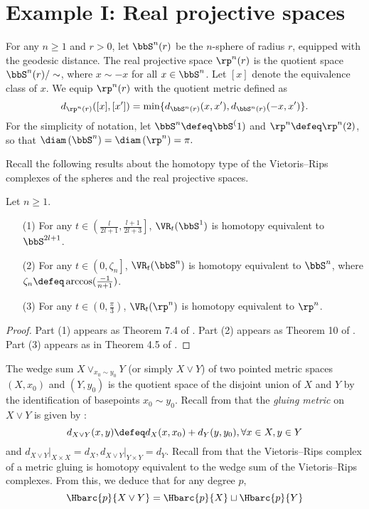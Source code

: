 
\section{Example I: Real projective spaces}\label{s:continuous}

For any $n\geq 1$ and $r>0$, let $\bbS^n(r)$ be the $n$-sphere of radius $r$, equipped with the geodesic distance.
The real projective space $\rp^n(r)$ is the quotient space $\bbS^n(r)/\sim$, where $x\sim -x$ for all $x\in \bbS^n $. Let $[x]$ denote the equivalence class of $x$. We equip $\rp^n(r)$ with the quotient metric defined as
\[d_{\rp^n(r)}([x],[x'])=\min \{d_{\bbS^n(r)}(x,x'),d_{\bbS^n(r)}(-x,x')\}.\]
For the simplicity of notation, let $\bbS^n\defeq\bbS^(1)$ and $\rp^n\defeq\rp^n(2)$, so that $\diam\left(\bbS^n \right)=\diam\left(\rp^n \right)=\pi.$

Recall the following results about the homotopy type of the Vietoris--Rips complexes of the spheres and the real projective spaces.
\begin{proposition}\label{prop:homotopy type}
	Let $n\geq 1$.
	\begin{itemize}
		\item[(1)]\label{prop:S1} For any $ t\in \left(\frac{l}{2l+1},\frac{l+1}{2l+3}\right]$, $\VR_t(\bbS^1)$ is homotopy equivalent to $\bbS^{2l+1}$.
		\item[(2)]\label{prop:Sn} For any $ t\in \left(0,\zeta_n\right]$, $\VR_t(\bbS^n)$ is homotopy equivalent to $\bbS^n$, where $\zeta_n\defeq\arccos(\frac{-1}{n+1})$.
		\item[(3)]\label{prop:RPn} For any $ t\in \left(0,\frac{\pi}{3} \right)$, $\VR_t(\rp^n)$ is homotopy equivalent to $\rp^n$.
	\end{itemize}
\end{proposition}

\begin{proof}
	Part (1) appears as Theorem 7.4 of \cite{adamaszek2017vietoris}. Part (2) appears as Theorem 10 of \cite{lim2020vietoris}. Part (3) appears as in Theorem 4.5 of \cite{adams2022metric}.
\end{proof}

The wedge sum $X\vee_{x_0\sim y_0} Y$ (or simply $X\vee Y$) of two pointed metric spaces $(X,x_0)$ and $(Y,y_0)$ is the quotient space of the disjoint union of $X$ and $Y$ by the identification of basepoints $x_0\sim y_0$.
Recall from \cite{burago2001course,adamaszek2020homotopy} that the \emph{gluing metric} on $X\vee Y$ is given by \label{para:gluing}:
$$d_{X\vee Y}(x,y)\defeq d_X(x,x_0)+d_Y(y,y_0),\forall x\in X, y\in Y$$
and $d_{X\vee Y}\vert_{X\times X}=d_X,d_{X\vee Y}\vert_{Y\times Y}=d_Y$.
Recall from \cite[Prop.~3.7]{adamaszek2020homotopy} that the Vietoris--Rips complex of a metric gluing is homotopy equivalent to the wedge sum of the Vietoris--Rips complexes. From this, we deduce that for any degree $p$,
\begin{equation}\label{eq:wedge sum}
	\Hbarc{p}{X\vee Y}= \Hbarc{p}{X}\sqcup \Hbarc{p}{Y}
\end{equation}

